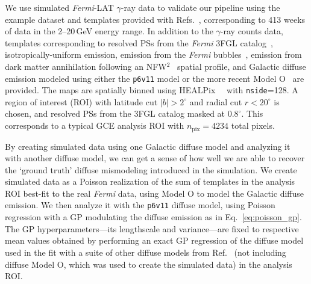 \documentclass[]{article}
\begin{document}
We use simulated \emph{Fermi}-LAT $\gamma$-ray data to validate our pipeline using the example dataset and templates provided with Refs.~\cite{Mishra-Sharma:2016gis,Buschmann:2020adf}, corresponding to 413 weeks of data in the 2--20\,GeV energy range. In addition to the $\gamma$-ray counts data, templates corresponding to resolved PSs from the \emph{Fermi} 3FGL catalog~\cite{Acero:2015hja}, isotropically-uniform emission, emission from the \emph{Fermi} bubbles~\cite{Su:2010qj}, emission from dark matter annihilation following an NFW$^2$~\cite{Navarro:1995iw,Navarro:1996gj} spatial profile, and Galactic diffuse emission modeled using either the \texttt{p6v11} model or the more recent Model O~\cite{Buschmann:2020adf} are provided. The maps are spatially binned using HEALPix~~\cite{Gorski:2004by,Zonca2019} with \texttt{nside}=128. A region of interest (ROI) with latitude cut $|b| > 2^\circ$ and radial cut $r < 20^\circ$ is chosen, and resolved PSs from the 3FGL catalog masked at $0.8^\circ$. This corresponds to a typical GCE analysis ROI with $n_\mathrm{pix}=4234$ total pixels. 

By creating simulated data using one Galactic diffuse model and analyzing it with another diffuse model, we can get a sense of how well we are able to recover the `ground truth' diffuse mismodeling introduced in the simulation. We create simulated data as a Poisson realization of the sum of templates in the analysis ROI best-fit to the real \emph{Fermi} data, using Model O to model the Galactic diffuse emission. We then analyze it with the \texttt{p6v11} diffuse model, using Poisson regression with a GP modulating the diffuse emission as in Eq.~\eqref{eq:poisson_gp}. The GP hyperparameters---its lengthscale and variance---are fixed to respective mean values obtained by performing an exact GP regression of the diffuse model used in the fit with a suite of other diffuse models from Ref.~\cite{Ackermann:2014usa} (not including diffuse Model O, which was used to create the simulated data) in the analysis ROI. 
\end{document}
